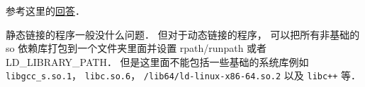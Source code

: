 
\begin{issues}
\issueDraft
\end{issues}


参考这里的\href{https://stackoverflow.com/questions/20183883/determining-binary-compatibility-under-linux}{回答}．

静态链接的程序一般没什么问题． 但对于动态链接的程序， 可以把所有非基础的 so 依赖库打包到一个文件夹里面并设置 rpath/runpath 或者 LD_LIBRARY_PATH． 但是这里面不能包括一些基础的系统库例如 \verb|libgcc_s.so.1|， \verb|libc.so.6|， \verb|/lib64/ld-linux-x86-64.so.2| 以及 \verb|libc++| 等．
